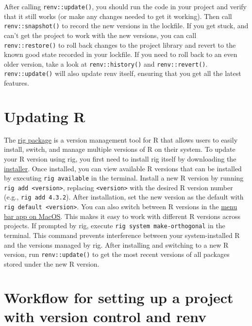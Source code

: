 \documentclass[
  letterpaper,
  DIV=11,
  numbers=noendperiod]{scrreport}
\begin{document}
After calling \texttt{renv::update()}, you should run the code in your
project and verify that it still works (or make any changes needed to
get it working). Then call \texttt{renv::snapshot()} to record the new
versions in the lockfile. If you get stuck, and can't get the project to
work with the new versions, you can call \texttt{renv::restore()} to
roll back changes to the project library and revert to the known good
state recorded in your lockfile. If you need to roll back to an even
older version, take a look at \texttt{renv::history()} and
\texttt{renv::revert()}. \texttt{renv::update()} will also update renv
itself, ensuring that you get all the latest features.

\section{Updating R}\label{updating-r}

The \href{https://github.com/r-lib/rig}{rig package} is a version
management tool for R that allows users to easily install, switch, and
manage multiple versions of R on their system. To update your R version
using rig, you first need to install rig itself by downloading the
\href{https://github.com/r-lib/rig/releases}{installer}. Once installed,
you can view available R versions that can be installed by executing
\texttt{rig\ available} in the terminal. Install a new R version by
running \texttt{rig\ add\ \textless{}version\textgreater{}}, replacing
\texttt{\textless{}version\textgreater{}} with the desired R version
number (e.g., \texttt{rig\ add\ 4.3.2}). After installation, set the new
version as the default with
\texttt{rig\ default\ \textless{}version\textgreater{}}. You can also
switch between R versions in the
\href{https://github.com/r-lib/rig?tab=readme-ov-file\#-macos-menu-bar-app-}{menu
bar app on MacOS}. This makes it easy to work with different R versions
across projects. If prompted by rig, execute
\texttt{rig\ system\ make-orthogonal} in the terminal. This command
prevents interference between your system-installed R and the versions
managed by rig. After installing and switching to a new R version, run
\texttt{renv::update()} to get the most recent versions of all packages
stored under the new R version.

\section{Workflow for setting up a project with version control and
renv}\label{workflow-for-setting-up-a-project-with-version-control-and-renv}
\end{document}
